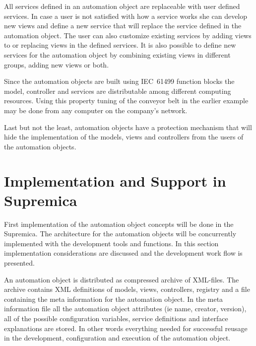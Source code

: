 All services defined in an automation object are replaceable
with user defined services. In case a user is not satisfied
with how a service works she can develop new views and
define a new service that will replace the service defined
in the automation object. The user can also customize
existing services by adding views to or replacing views in
the defined services. It is also possible to define new
services for the automation object by combining existing
views in different groups, adding new views or both.

Since the automation objects are built using IEC~61499
function blocks the model, controller and services are
distributable among different computing resources. Using
this property tuning of the conveyor belt in the earlier
example may be done from any computer on the company's
network.

Last but not the least, automation objects have a
protection mechanism that will hide the implementation of
the models, views and controllers from the users of the
automation objects.


\section{Implementation and Support in Supremica}
First implementation of the automation object concepts will
be done in the Supremica. The architecture for the
automation objects will be concurrently implemented with the
development tools and functions. In this section
implementation considerations are discussed and the
development work flow is presented.

An automation object is distributed as compressed archive of
XML-files. The archive contains XML definitions of models,
views, controllers, registry and a file containing the meta
information for the automation object. In the meta
information file all the automation object attributes
(ie name, creator, version), all of the possible
configuration variables, service definitions and interface
explanations are stored. In other words everything needed
for successful reusage in the development, configuration and
execution of the automation object. 

